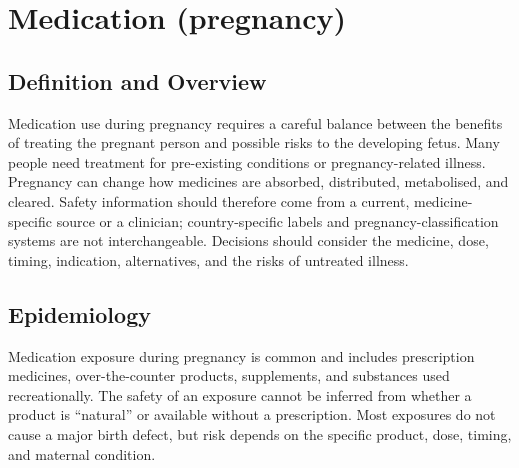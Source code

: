 \chapter{Medication (pregnancy)}

\section*{Definition and Overview}
Medication use during pregnancy requires a careful balance between the benefits of treating the pregnant person and possible risks to the developing fetus. Many people need treatment for pre-existing conditions or pregnancy-related illness. Pregnancy can change how medicines are absorbed, distributed, metabolised, and cleared. Safety information should therefore come from a current, medicine-specific source or a clinician; country-specific labels and pregnancy-classification systems are not interchangeable. Decisions should consider the medicine, dose, timing, indication, alternatives, and the risks of untreated illness.

\section*{Epidemiology}
Medication exposure during pregnancy is common and includes prescription medicines, over-the-counter products, supplements, and substances used recreationally. The safety of an exposure cannot be inferred from whether a product is “natural” or available without a prescription. Most exposures do not cause a major birth defect, but risk depends on the specific product, dose, timing, and maternal condition.

